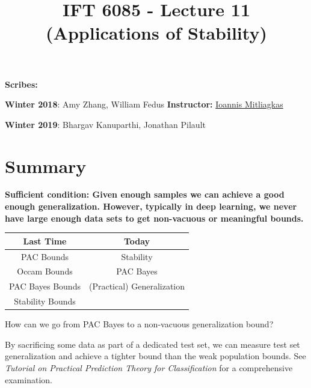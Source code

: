 \documentclass{article}
\title{IFT 6085 - Lecture 11 \\ 
(Applications of Stability) }
\date{}
\begin{document}
 

\maketitle

\textbf{Scribes:} 

\textbf{Winter 2018}: Amy Zhang, William Fedus
\hfill
\textbf{Instructor:} {\href{https://mitliagkas.github.io/}{Ioannis Mitliagkas}}

\textbf{Winter 2019}: Bhargav Kanuparthi, Jonathan Pilault



\newcommand{\infgc}{\inf_{g \in \mathcal{C}}}
\newcommand{\supgc}{\sup_{g \in \mathcal{C}}}

\newcommand{\Prob}{\mathbb{P}}
\newcommand{\E}{\mathbb{E}}
\newcommand{\reals}{\mathbb{R}}

\section*{Summary}
\textbf{Sufficient condition: Given enough samples we can achieve a good enough generalization.  However, typically in deep learning, we never have large enough data sets to get non-vacuous or meaningful bounds.}

\begin{table}[h!]
\centering
\begin{tabular}{|c  | c|} 
 \hline
 \rowcolor{shadethmcolor}
 \textbf{Last Time} & \textbf{Today} \\ [0.5ex] 
 \hline
 PAC Bounds &  Stability \\
 Occam Bounds & PAC Bayes \\
 PAC Bayes Bounds & (Practical) Generalization \\
 Stability Bounds &  \\
\hline
\end{tabular}
\end{table}

How can we go from PAC Bayes to a non-vacuous generalization bound?

\vspace{0.3cm}
By sacrificing some data as part of a dedicated test set, we can measure test set generalization and achieve a tighter bound than the weak population bounds.  See \textit{Tutorial on Practical Prediction Theory for Classification} \cite{Langford:2005:TPP:1046920.1058111} for a comprehensive examination.
\end{document}
